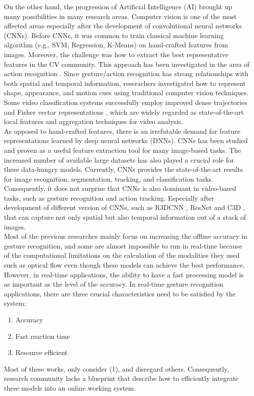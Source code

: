 On the other hand, the progression of Artificial Intelligence (AI)  brought up many possibilities in many research areas.  Computer vision is one of the most affected areas especially after the development of convolutional  neural networks (CNNs).  Before CNNs, it was common to train classical machine learning algorithm  (e.g., SVM, Regression, K-Means) on hand-crafted features from images. Moreover, the challenge was how to extract the best representative features in the CV community.  This approach has been investigated in the area of action recognition \cite{shen_dynamic_2012,tamrakar_evaluation_2012,wang_robust_2015}.   Since gesture/action recognition has strong relationships with both spatial and temporal information, reserachers investigated how to represent shape, appearance,  and motion cues using traditional computer vision techniques.  Some video classification systems successfully employ improved dense trajectories  \cite{wang_robust_2015} and Fisher vector representations \cite{perronnin_improving_2010} , which are widely regarded as state-of-the-art local features and aggregation techniques for video analysis.\\

As opposed to hand-crafted features, there is an irrefutable demand for feature representations learned by deep neural networks (DNNs).  CNNs has been studied and proven as a useful feature extraction tool for many image-based tasks.  The increased number of available large datasets has also played a crucial role for these data-hungry models.  Currently, CNNs provides the state-of-the-art results for image recognition, segmentation, tracking,  and classification tasks.  Consequently,  it does not  surprise  that  CNNs is also dominant in video-based tasks,  such as gesture  recognition and  action  tracking.   Especially after development of different version of CNNs, such as R3DCNN \cite{molchanov_online_2016}, ResNet  \cite{hara_can_2017} and  C3D \cite{tran_learning_2014}, that  can capture  not  only spatial  but  also temporal information  out of a stack of images.\\


Most of the previous researches mainly focus on increasing the offline accuracy in gesture recognition, and some are almost impossible to run in real-time because of the computational limitations on the calculation of the modalities they used such as optical flow even though these models can achieve the best performance.  However, in real-time applications, the ability to have a fast processing model is as important as the level of the accuracy.  In real-time  gesture recognition applications, there are three crucial characteristics need to be satisfied by the system:
\begin{enumerate}
\item Accuracy
\item Fast reaction time
\item Resource efficient
\end{enumerate}
Most of these works, only consider (1), and disregard others. Consequently, research community lacks a blueprint that describe how to efficiently integrate these models into an online working system.\\

